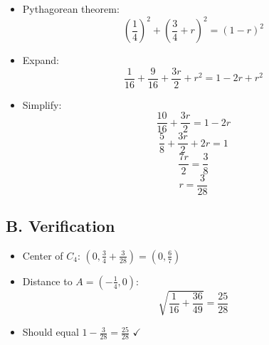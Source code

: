 \documentclass[11pt]{article}
\begin{document}
\begin{solutionbox}
\begin{itemize}
    \item Pythagorean theorem:
    \[\left(\frac{1}{4}\right)^2 + \left(\frac{3}{4} + r\right)^2 = (1-r)^2\]
    
    \item Expand:
    \[\frac{1}{16} + \frac{9}{16} + \frac{3r}{2} + r^2 = 1 - 2r + r^2\]
    
    \item Simplify:
    \[\frac{10}{16} + \frac{3r}{2} = 1 - 2r\]
    \[\frac{5}{8} + \frac{3r}{2} + 2r = 1\]
    \[\frac{7r}{2} = \frac{3}{8}\]
    \[r = \frac{3}{28}\]
\end{itemize}

\subsection*{B. Verification}
\begin{itemize}
    \item Center of $C_4$: $(0, \frac{3}{4} + \frac{3}{28}) = (0, \frac{6}{7})$
    \item Distance to $A = (-\frac{1}{4}, 0)$:
    \[\sqrt{\frac{1}{16} + \frac{36}{49}} = \frac{25}{28}\]
    \item Should equal $1 - \frac{3}{28} = \frac{25}{28}$ $\checkmark$
\end{itemize}
\end{solutionbox}
\end{document}

